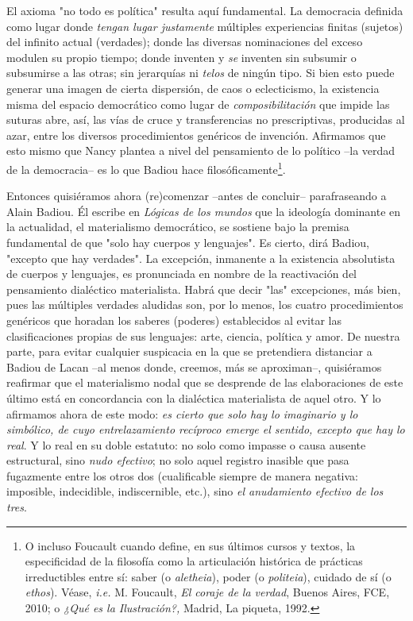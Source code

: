 El axioma "no todo es política" resulta aquí fundamental. La democracia
definida como lugar donde \emph{tengan lugar justamente} múltiples
experiencias finitas (sujetos) del infinito actual (verdades); donde las
diversas nominaciones del exceso modulen su propio tiempo; donde
inventen y \emph{se} inventen sin subsumir o subsumirse a las otras; sin
jerarquías ni \emph{telos} de ningún tipo. Si bien esto puede generar
una imagen de cierta dispersión, de caos o eclecticismo, la existencia
misma del espacio democrático como lugar de \emph{composibilitación} que
impide las suturas abre, así, las vías de cruce y transferencias no
prescriptivas, producidas al azar, entre los diversos procedimientos
genéricos de invención. Afirmamos que esto mismo que Nancy plantea a
nivel del pensamiento de lo político --la verdad de la democracia-- es
lo que Badiou hace filosóficamente\footnote{O incluso Foucault cuando
  define, en sus últimos cursos y textos, la especificidad de la
  filosofía como la articulación histórica de prácticas irreductibles
  entre sí: saber (o \emph{aletheia}), poder (o \emph{politeia}),
  cuidado de sí (o \emph{ethos}). Véase, \emph{i.e.} M. Foucault,
  \emph{El coraje de la verdad}, Buenos Aires, FCE, 2010; o \emph{¿Qué
  es la Ilustración?,} Madrid, La piqueta, 1992.}.

Entonces quisiéramos ahora (re)comenzar --antes de concluir--
parafraseando a Alain Badiou. Él escribe en \emph{Lógicas de los mundos}
que la ideología dominante en la actualidad, el materialismo
democrático, se sostiene bajo la premisa fundamental de que "solo hay
cuerpos y lenguajes". Es cierto, dirá Badiou, "excepto que hay
verdades". La excepción, inmanente a la existencia absolutista de
cuerpos y lenguajes, es pronunciada en nombre de la reactivación del
pensamiento dialéctico materialista. Habrá que decir "las" excepciones,
más bien, pues las múltiples verdades aludidas son, por lo menos, los
cuatro procedimientos genéricos que horadan los saberes (poderes)
establecidos al evitar las clasificaciones propias de sus lenguajes:
arte, ciencia, política y amor. De nuestra parte, para evitar cualquier
suspicacia en la que se pretendiera distanciar a Badiou de Lacan --al
menos donde, creemos, más se aproximan--, quisiéramos reafirmar que el
materialismo nodal que se desprende de las elaboraciones de este último
está en concordancia con la dialéctica materialista de aquel otro. Y lo
afirmamos ahora de este modo: \emph{es cierto que solo hay lo imaginario
y lo simbólico, de cuyo entrelazamiento recíproco emerge el sentido,
excepto que hay lo real}. Y lo real en su doble estatuto: no solo como
impasse o causa ausente estructural, sino \emph{nudo efectivo}; no solo
aquel registro inasible que pasa fugazmente entre los otros dos
(cualificable siempre de manera negativa: imposible, indecidible,
indiscernible, etc.), sino \emph{el anudamiento efectivo de los tres}.

